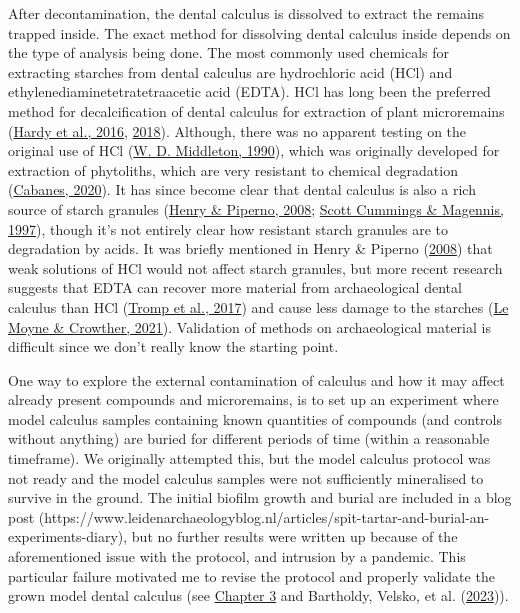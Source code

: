 \documentclass[
  letterpaper,
]{book}
\begin{document}
After decontamination, the dental calculus is dissolved to extract the
remains trapped inside. The exact method for dissolving dental calculus
inside depends on the type of analysis being done. The most commonly
used chemicals for extracting starches from dental calculus are
hydrochloric acid (HCl) and ethylenediaminetetratetraacetic acid (EDTA).
HCl has long been the preferred method for decalcification of dental
calculus for extraction of plant microremains
(\protect\hyperlink{ref-hardyDentalCalculus2016}{Hardy et al., 2016},
\protect\hyperlink{ref-hardyRecoveringInformation2018}{2018}). Although,
there was no apparent testing on the original use of HCl
(\protect\hyperlink{ref-middletonImprovedMethod1990}{W. D. Middleton,
1990}), which was originally developed for extraction of phytoliths,
which are very resistant to chemical degradation
(\protect\hyperlink{ref-cabanesPhytolithAnalysis2020}{Cabanes, 2020}).
It has since become clear that dental calculus is also a rich source of
starch granules (\protect\hyperlink{ref-henryCalculusSyria2008}{Henry \&
Piperno, 2008}; \protect\hyperlink{ref-cummingsMayanCalculus1997}{Scott
Cummings \& Magennis, 1997}), though it's not entirely clear how
resistant starch granules are to degradation by acids. It was briefly
mentioned in Henry \& Piperno
(\protect\hyperlink{ref-henryCalculusSyria2008}{2008}) that weak
solutions of HCl would not affect starch granules, but more recent
research suggests that EDTA can recover more material from
archaeological dental calculus than HCl
(\protect\hyperlink{ref-trompEDTACalculus2017}{Tromp et al., 2017}) and
cause less damage to the starches
(\protect\hyperlink{ref-lemoyneCalculusPretreatments2021}{Le Moyne \&
Crowther, 2021}). Validation of methods on archaeological material is
difficult since we don't really know the starting point.

One way to explore the external contamination of calculus and how it may
affect already present compounds and microremains, is to set up an
experiment where model calculus samples containing known quantities of
compounds (and controls without anything) are buried for different
periods of time (within a reasonable timeframe). We originally attempted
this, but the model calculus protocol was not ready and the model
calculus samples were not sufficiently mineralised to survive in the
ground. The initial biofilm growth and burial are included in a blog
post
(https://www.leidenarchaeologyblog.nl/articles/spit-tartar-and-burial-an-experiments-diary),
but no further results were written up because of the aforementioned
issue with the protocol, and intrusion by a pandemic. This particular
failure motivated me to revise the protocol and properly validate the
grown model dental calculus (see \protect\hyperlink{byoc-valid}{Chapter
3} and Bartholdy, Velsko, et al.
(\protect\hyperlink{ref-bartholdyAssessingValidity2023}{2023})).
\end{document}
